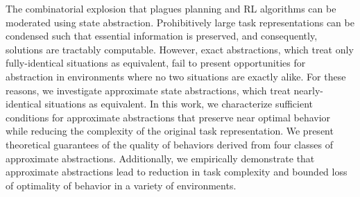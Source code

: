 The combinatorial explosion that plagues planning and \ac{RL} algorithms can be moderated using state abstraction. Prohibitively large task representations can be condensed such that essential information is preserved, and consequently, solutions are tractably computable. However, exact abstractions, which treat only fully-identical situations as equivalent, fail to present opportunities for abstraction in environments where no two situations are exactly alike. For these reasons, we investigate approximate state abstractions, which treat nearly-identical situations as equivalent. In this work, we characterize sufficient conditions for approximate abstractions that preserve near optimal behavior while reducing the complexity of the original task representation. We present theoretical guarantees of the quality of behaviors derived from four classes of approximate abstractions. Additionally, we empirically demonstrate that approximate abstractions lead to reduction in task complexity and bounded loss of optimality of behavior in a variety of environments. %










%
%





